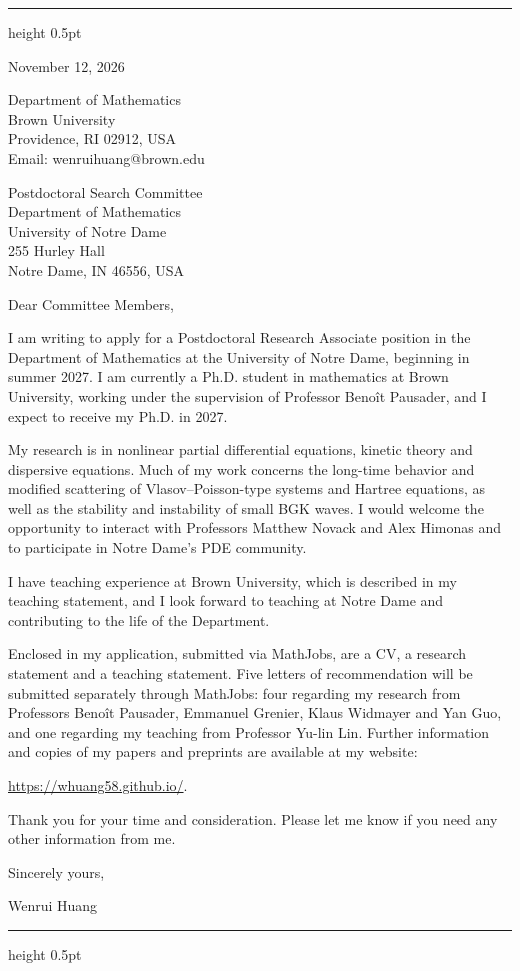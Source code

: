 \documentclass[10pt]{article}
\begin{document}
\vspace{0.08in}
\hrule height 0.5pt

\vspace{0.47in}
\hfill
\begin{minipage}{2.27in}
November 12, 2026

\vspace{0.16in}
Department of Mathematics\\
Brown University\\
Providence, RI 02912, USA\\
Email: wenrui\textunderscore huang@brown.edu
\end{minipage}

\vspace{0.30in}
Postdoctoral Search Committee\\
Department of Mathematics\\
University of Notre Dame\\
255 Hurley Hall\\
Notre Dame, IN 46556, USA

\vspace{0.16in}
Dear Committee Members,

I am writing to apply for a Postdoctoral Research Associate position in the Department of Mathematics at the University of Notre Dame, beginning in summer 2027. I am currently a Ph.D. student in mathematics at Brown University, working under the supervision of Professor Beno\^{i}t Pausader, and I expect to receive my Ph.D. in 2027.

My research is in nonlinear partial differential equations, kinetic theory and dispersive equations. Much of my work concerns the long-time behavior and modified scattering of Vlasov--Poisson-type systems and Hartree equations, as well as the stability and instability of small BGK waves. I would welcome the opportunity to interact with Professors Matthew Novack and Alex Himonas and to participate in Notre Dame's PDE community.

I have teaching experience at Brown University, which is described in my teaching statement, and I look forward to teaching at Notre Dame and contributing to the life of the Department.

Enclosed in my application, submitted via MathJobs, are a CV, a research statement and a teaching statement. Five letters of recommendation will be submitted separately through MathJobs: four regarding my research from Professors Beno\^{i}t Pausader, Emmanuel Grenier, Klaus Widmayer and Yan Guo, and one regarding my teaching from Professor Yu-lin Lin. Further information and copies of my papers and preprints are available at my website:

\url{https://whuang58.github.io/}.

\medskip
Thank you for your time and consideration. Please let me know if you need any other information from me.

\vspace{0.12in}
Sincerely yours,

\vspace{0.12in}
Wenrui Huang

\vfill
\hrule height 0.5pt
\end{document}

